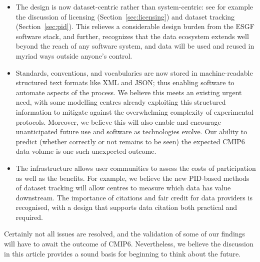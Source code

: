 \documentclass[gmd,manuscript]{copernicus}
\newcommand{\secref}[1] {\mbox{Section  \ref{sec:#1}}}
\begin{document}
\begin{itemize}
\item The design is now dataset-centric rather than system-centric:
  see for example the discussion of licensing (\secref{licensing}) and
  dataset tracking (\secref{pid}). This relieves a considerable design
  burden from the ESGF software stack, and further, recognizes that
  the data ecosystem extends well beyond the reach of any software
  system, and data will be used and reused in myriad ways outside
  anyone's control.
\item Standards, conventions, and vocabularies are now stored in
  machine-readable structured text formats like XML and JSON; thus
  enabling software to automate aspects of the process. We believe
  this meets an existing urgent need, with some modelling centres
  already exploiting this structured information to mitigate against
  the overwhelming complexity of experimental protocols. Moreover, we
  believe this will also enable and encourage unanticipated future use
  and software as technologies evolve. Our ability to predict (whether
  correctly or not remains to be seen) the expected CMIP6 data volume
  is one such unexpected outcome.
\item The infrastructure allows user communities to assess the costs
  of participation as well as the benefits. For example, we believe
  the new PID-based methods of dataset tracking will allow centres to
  measure which data has value downstream. The importance of citations
  and fair credit for data providers is recognised, with a design that
  supports data citation both practical and required.
\end{itemize}


Certainly not all issues are resolved, and the validation of some of
our findings will have to await the outcome of CMIP6. Nevertheless, we
believe the discussion in this article provides a sound basis for
beginning to think about the future.
\end{document}
